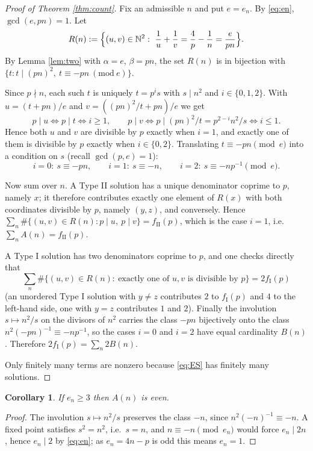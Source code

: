 \documentclass[11pt,reqno]{amsart}
\theoremstyle{plain}
\newtheorem{corollary}[theorem]{Corollary}
\theoremstyle{definition}
\numberwithin{equation}{section}
\newcommand{\N}{\mathbb{N}}
\newcommand{\fI}{f_{\mathrm{I}}}
\newcommand{\fII}{f_{\mathrm{II}}}
\begin{document}
\begin{proof}[Proof of Theorem \ref{thm:count}]
Fix an admissible $n$ and put $e=e_{n}$. By \eqref{eq:en}, $\gcd(e,pn)=1$. Let
\[
  R(n):=\Bigl\{(u,v)\in\N^{2}:\ \frac1u+\frac1v=\frac4p-\frac1n=\frac{e}{pn}\Bigr\}.
\]
By Lemma \ref{lem:two} with $\alpha=e$, $\beta=pn$, the set $R(n)$ is in bijection
with $\{t: t\mid (pn)^{2},\ t\equiv-pn\ (\mathrm{mod}\ e)\}$.

Since $p\nmid n$, each such $t$ is uniquely $t=p^{i}s$ with $s\mid n^{2}$ and
$i\in\{0,1,2\}$. With $u=(t+pn)/e$ and $v=((pn)^{2}/t+pn)/e$ we get
\[
  p\mid u\iff p\mid t\iff i\ge1,\qquad
  p\mid v\iff p\mid (pn)^{2}/t=p^{2-i}n^{2}/s\iff i\le1 .
\]
Hence both $u$ and $v$ are divisible by $p$ exactly when $i=1$, and exactly one of
them is divisible by $p$ exactly when $i\in\{0,2\}$. Translating
$t\equiv-pn\pmod e$ into a condition on $s$ (recall $\gcd(p,e)=1$):
\[
  i=0:\ s\equiv-pn,\qquad i=1:\ s\equiv-n,\qquad i=2:\ s\equiv-np^{-1}\pmod e .
\]

Now sum over $n$. A Type II solution has a unique denominator coprime to $p$, namely
$x$; it therefore contributes exactly one element of $R(x)$ with both coordinates
divisible by $p$, namely $(y,z)$, and conversely. Hence
$\sum_{n}\#\{(u,v)\in R(n):p\mid u,\ p\mid v\}=\fII(p)$, which is the case $i=1$,
i.e.\ $\sum_{n}A(n)=\fII(p)$.

A Type I solution has two denominators coprime to $p$, and one checks directly that
\[
  \sum_{n}\#\{(u,v)\in R(n):\ \text{exactly one of }u,v\text{ is divisible by }p\}
  =2\fI(p)
\]
(an unordered Type I solution with $y\ne z$ contributes $2$ to $\fI(p)$ and $4$ to the
left-hand side, one with $y=z$ contributes $1$ and $2$). Finally the involution
$s\mapsto n^{2}/s$ on the divisors of $n^{2}$ carries the class $-pn$ bijectively onto
the class $n^{2}(-pn)^{-1}\equiv-np^{-1}$, so the cases $i=0$ and $i=2$ have equal
cardinality $B(n)$. Therefore $2\fI(p)=\sum_{n}2B(n)$.

Only finitely many terms are nonzero because \eqref{eq:ES} has finitely many
solutions.
\end{proof}

\begin{corollary}\label{cor:parityA}
If $e_{n}\ge3$ then $A(n)$ is even.
\end{corollary}

\begin{proof}
The involution $s\mapsto n^{2}/s$ preserves the class $-n$, since
$n^{2}(-n)^{-1}\equiv-n$. A fixed point satisfies $s^{2}=n^{2}$, i.e.\ $s=n$, and
$n\equiv-n\pmod{e_{n}}$ would force $e_{n}\mid2n$, hence $e_{n}\mid2$ by
\eqref{eq:en}; as $e_{n}=4n-p$ is odd this means $e_{n}=1$.
\end{proof}
\end{document}
